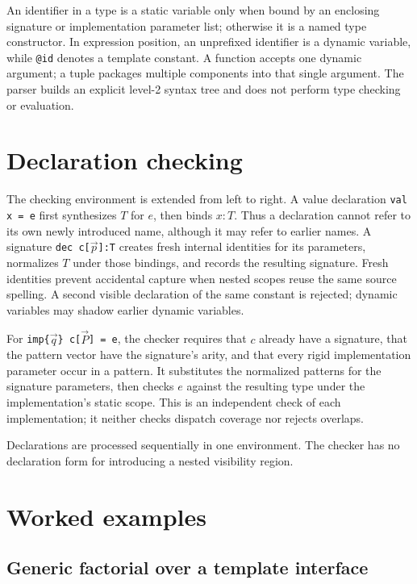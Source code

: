 \documentclass[11pt]{article}
\begin{document}
An identifier in a type is a static variable only when bound by an enclosing
signature or implementation parameter list; otherwise it is a named type
constructor. In expression position, an unprefixed identifier is a dynamic
variable, while \texttt{@id} denotes a template constant. A function accepts
one dynamic argument; a tuple packages multiple components into that single
argument. The parser builds an explicit level-2 syntax tree and does not
perform type checking or evaluation.

\section{Declaration checking}

The checking environment is extended from left to right. A value declaration
\texttt{val x = e} first synthesizes \(T\) for \(e\), then binds
\(x:T\). Thus a declaration cannot refer to its own newly introduced name,
although it may refer to earlier names. A signature
\texttt{dec c[\(\vec p\)]:T} creates fresh internal identities for its
parameters, normalizes \(T\) under those bindings, and records the resulting
signature. Fresh identities prevent accidental capture when nested scopes
reuse the same source spelling. A second visible declaration of the same
constant is rejected; dynamic variables may shadow earlier dynamic variables.

For \texttt{imp\{\(\vec q\)\} c[\(\vec P\)] = e}, the checker requires
that \(c\) already have a signature, that the pattern vector have the
signature's arity, and that every rigid implementation parameter occur in a
pattern. It substitutes the normalized patterns for the signature
parameters, then checks \(e\) against the resulting type under the
implementation's static scope. This is an independent check of each
implementation; it neither checks dispatch coverage nor rejects overlaps.

Declarations are processed sequentially in one environment. The checker has
no declaration form for introducing a nested visibility region.

\section{Worked examples}

\subsection{Generic factorial over a template interface}
\end{document}
